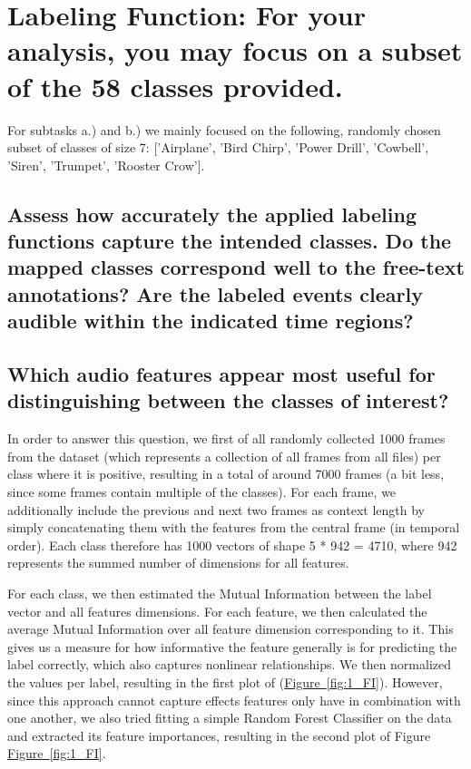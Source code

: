 \section{Labeling Function: {\normalfont\normalsize For your analysis, you may focus on a subset of the 58 classes provided.}}
\label{sec:Labeling Function}

For subtasks a.) and b.) we mainly focused on the following, randomly chosen subset of classes of size 7: ['Airplane', 'Bird Chirp', 'Power Drill', 'Cowbell', 'Siren', 'Trumpet', 'Rooster Crow'].

\subsection{Assess how accurately the applied labeling functions capture the intended classes. Do the mapped classes correspond well to the free-text annotations? Are the labeled events clearly audible within the indicated time regions?}
\label{sec:Labeling Function:a}

\subsection{Which audio features appear most useful for distinguishing between the classes of interest? }
\label{sec:Labeling Function:b}

In order to answer this question, we first of all randomly collected 1000 frames from the dataset (which represents a collection of all frames from all files) per class where it is positive, resulting in a total of around 7000 frames (a bit less, since some frames contain multiple of the classes). For each frame, we additionally include the previous and next two frames as context length by simply concatenating them with the features from the central frame (in temporal order). Each class therefore has 1000 vectors of shape 5 * 942 = 4710, where 942 represents the summed number of dimensions for all features.

For each class, we then estimated the Mutual Information between the label vector and all features dimensions. For each feature, we then calculated the average Mutual Information over all feature dimension corresponding to it. This gives us a measure for how informative the feature generally is for predicting the label correctly, which also captures nonlinear relationships. We then normalized the values per label, resulting in the first plot of (\hyperref[fig:1_FI]{Figure~\ref*{fig:1_FI}}). However, since this approach cannot capture effects features only have in combination with one another, we also tried fitting a simple Random Forest Classifier on the data and extracted its feature importances, resulting in the second plot of Figure \hyperref[fig:1_FI]{Figure~\ref*{fig:1_FI}}.

